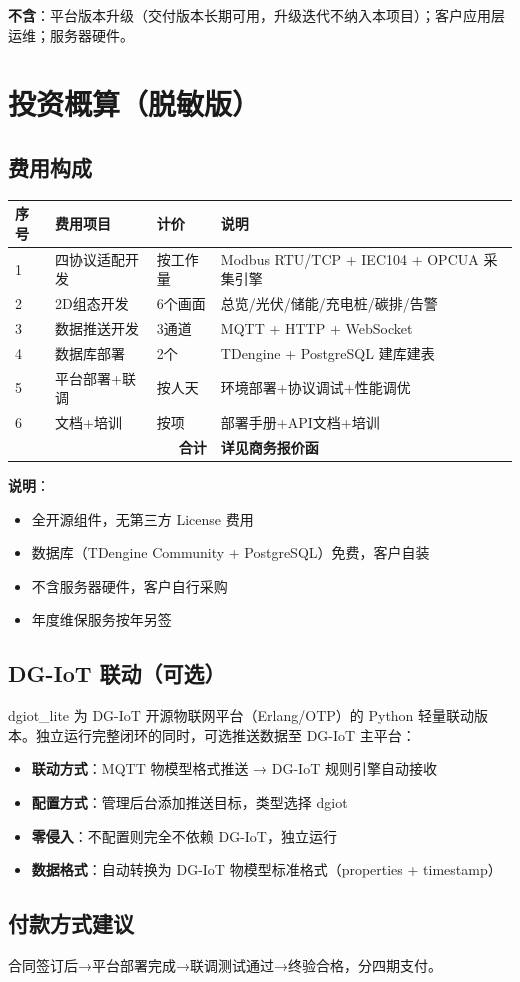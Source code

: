\documentclass[12pt,a4paper]{ctexart}
\begin{document}
\textbf{不含}：平台版本升级（交付版本长期可用，升级迭代不纳入本项目）；客户应用层运维；服务器硬件。

\section{投资概算（脱敏版）}

\subsection{费用构成}

\begin{table}[H]\centering
\begin{tabular}{p{1.2cm}p{3.5cm}p{3cm}p{5cm}}
\toprule\textbf{序号} & \textbf{费用项目} & \textbf{计价} & \textbf{说明} \\
\midrule
1 & 四协议适配开发 & 按工作量 & Modbus RTU/TCP + IEC104 + OPCUA 采集引擎 \\
2 & 2D组态开发 & 6个画面 & 总览/光伏/储能/充电桩/碳排/告警 \\
3 & 数据推送开发 & 3通道 & MQTT + HTTP + WebSocket \\
4 & 数据库部署 & 2个 & TDengine + PostgreSQL 建库建表 \\
5 & 平台部署+联调 & 按人天 & 环境部署+协议调试+性能调优 \\
6 & 文档+培训 & 按项 & 部署手册+API文档+培训 \\
\hline
\multicolumn{3}{r}{\textbf{合计}} & \textbf{详见商务报价函} \\
\bottomrule
\end{tabular}
\end{table}

\textbf{说明}：
\begin{itemize}
  \item 全开源组件，无第三方 License 费用
  \item 数据库（TDengine Community + PostgreSQL）免费，客户自装
  \item 不含服务器硬件，客户自行采购
  \item 年度维保服务按年另签
\end{itemize}

\subsection{DG-IoT 联动（可选）}

dgiot\_lite 为 DG-IoT 开源物联网平台（Erlang/OTP）的 Python 轻量联动版本。独立运行完整闭环的同时，可选推送数据至 DG-IoT 主平台：

\begin{itemize}
  \item \textbf{联动方式}：MQTT 物模型格式推送 → DG-IoT 规则引擎自动接收
  \item \textbf{配置方式}：管理后台添加推送目标，类型选择 dgiot
  \item \textbf{零侵入}：不配置则完全不依赖 DG-IoT，独立运行
  \item \textbf{数据格式}：自动转换为 DG-IoT 物模型标准格式（properties + timestamp）
\end{itemize}

\subsection{付款方式建议}
合同签订后→平台部署完成→联调测试通过→终验合格，分四期支付。
\end{document}
